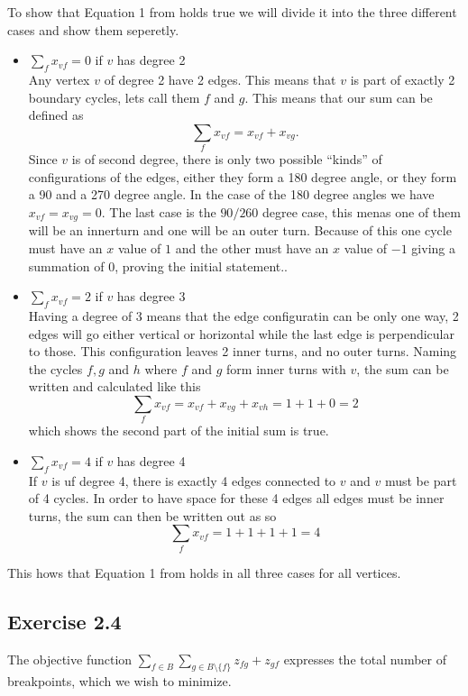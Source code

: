To show that Equation 1 from \cite{assignment1} holds true we will divide it
into the three different cases and show them seperetly.
\begin{itemize}
\item $\sum_f x_{vf} = 0$ if $v$ has degree 2 \\
  Any vertex $v$ of degree 2 have 2 edges. This means that $v$ is part of
  exactly 2 boundary cycles, lets call them $f$ and $g$. This means that our sum
  can be defined as
  \[
    \sum_f x_{vf} = x_{vf} + x_{vg}.
  \]
  Since $v$ is of second degree, there is only two possible ``kinds'' of
  configurations of the edges, either they form a 180 degree angle, or they form
  a 90 and a 270 degree angle.  In the case of the 180 degree angles we have
  $x_{vf} = x_{vg} = 0$. The last case is the $90/260$ degree case, this menas
  one of them will be an innerturn and one will be an outer turn. Because of
  this one cycle must have an $x$ value of $1$ and the other must have an $x$
  value of $-1$ giving a summation of 0, proving the initial statement..
\item $\sum_f x_{vf} = 2$ if $v$ has degree 3 \\
  Having a degree of 3 means that the edge configuratin can be only one way, 2
  edges will go either vertical or horizontal while the last edge is
  perpendicular to those. This configuration leaves 2 inner turns, and no outer
  turns. Naming the cycles $f, g$ and $h$ where $f$ and $g$ form inner turns
  with $v$, the sum can be written and calculated like this
  \[
    \sum_f x_{vf} = x_{vf} + x_{vg} + x_{vh} = 1 + 1 + 0 = 2
  \]
  which shows the second part of the initial sum is true.

\item $\sum_f x_{vf} = 4$ if $v$ has degree 4 \\
  If $v$ is uf degree 4, there is exactly 4 edges connected to $v$ and $v$ must
  be part of 4 cycles. In order to have space for these 4 edges all edges must
  be inner turns, the sum can then be written out as so
  \[
    \sum_f x_{vf} = 1 + 1 + 1 + 1 = 4
  \]
\end{itemize}
%
This hows that Equation 1 from \cite{assignment1} holds in all three cases for
all vertices.
%
\subsection{Exercise 2.4}
%
The objective function $\sum_{f\in B} \sum_{g\in B\setminus\{f\}} z_{fg} + z_{gf}$
expresses the total number of breakpoints, which we wish to minimize.


